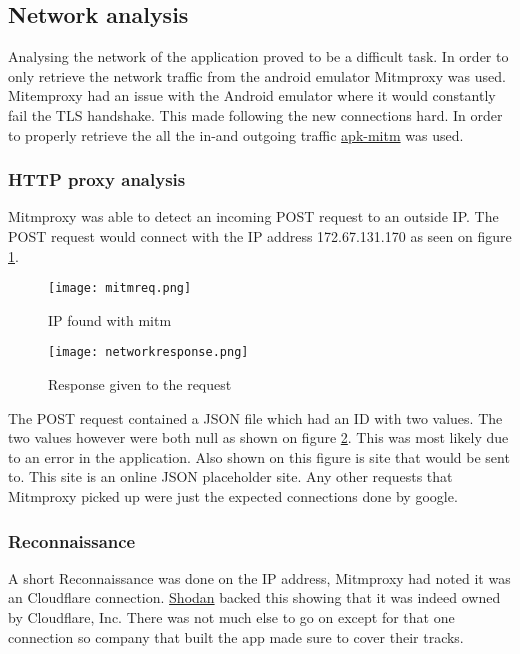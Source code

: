 \subsection{Network analysis}

Analysing the network of the application proved to be a difficult task. 
In order to only retrieve the network traffic from the android emulator Mitmproxy was used.
Mitemproxy had an issue with the Android emulator where it would constantly fail the TLS handshake. 
This made following the new connections hard. 
In order to properly retrieve the all the in-and outgoing traffic \href{https://github.com/shroudedcode/apk-mitm}{apk-mitm} was used.



\subsubsection{HTTP proxy analysis}

Mitmproxy was able to detect an incoming POST request to an outside IP. 
The POST request would connect with the IP address 172.67.131.170 as seen on figure \ref{tim-mitmrequest}.

\begin{figure}[H]
    \texttt{[image: mitmreq.png]}
    \caption{IP found with mitm}
    \label{tim-mitmrequest}
\end{figure}

\begin{figure}[H]
    \texttt{[image: networkresponse.png]}
    \caption{Response given to the request}
    \label{tim-mitmresponse}
\end{figure}

The POST request contained a JSON file which had an ID with two values. 
The two values however were both null as shown on figure \ref{tim-mitmresponse}.
This was most likely due to an error in the application. 
Also shown on this figure is site that would be sent to.
This site is an online JSON placeholder site.
Any other requests that Mitmproxy picked up were just the expected connections done by google.

\subsubsection{Reconnaissance}

A short Reconnaissance was done on the IP address, Mitmproxy had noted it was an Cloudflare connection.
\href{https://www.shodan.io/host/172.67.131.170}{Shodan} backed this showing that it was indeed owned by Cloudflare, Inc.
There was not much else to go on except for that one connection so company that built the app made sure to cover their tracks.
